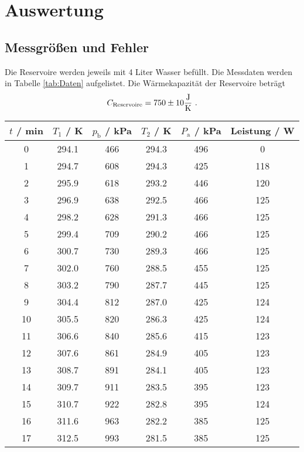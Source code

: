 \section{Auswertung}
\label{sec:Auswertung}
\subsection{Messgrößen und Fehler}
Die Reservoire werden jeweils mit 4 Liter Wasser befüllt. Die Messdaten werden in Tabelle \ref{tab:Daten} aufgelistet. Die Wärmekapazität der Reservoire beträgt
\begin{equation}
  C_{\text{Reservoire}} = \num{750 +- 10} \frac{\text{J}}{\text{K}} \ .
  \label{eqn:c_re}
\end{equation}

\begin{table}
  \centering
  \begin{tabular}{c c c c c c}
    \toprule
    $t$ / min & $T_\text{1}$ / K & $p_\text{b}$ / kPa & $T_\text{2}$ / K & $P_\text{a}$ / kPa & Leistung / W \\
    \midrule
    0 	& 294.1 & 466	& 294.3	& 496	& 0	    \\
    1 	& 294.7 & 608	& 294.3	& 425	& 118	\\
    2 	& 295.9 & 618	& 293.2	& 446	& 120	  \\
    3 	& 296.9 & 638	& 292.5	& 466	& 125	\\
    4	& 298.2	& 628	& 291.3	& 466	& 125	\\
    5	& 299.4 & 709	& 290.2	& 466	& 125	\\
    6	& 300.7 & 730	& 289.3	& 466	& 125	\\
    7	& 302.0 & 760	& 288.5	& 455	& 125	\\
    8	& 303.2	& 790	& 287.7	& 445	& 125	\\
    9	& 304.4 & 812	& 287.0	& 425	& 124	\\
    10	& 305.5 & 820	& 286.3	& 425	& 124	\\
    11 	& 306.6 & 840	& 285.6	& 415	& 123	\\
    12	& 307.6	& 861	& 284.9	& 405	& 123	\\
    13	& 308.7 & 891	& 284.1	& 405	& 123	\\
    14 	& 309.7 & 911	& 283.5	& 395	& 123	\\
    15 	& 310.7 & 922	& 282.8	& 395	& 124	\\
    16 	& 311.6	& 963	& 282.2	& 385	& 125	\\
    17	& 312.5	& 993	& 281.5	& 385	& 125	\\

\end{tabular}
\end{table}

